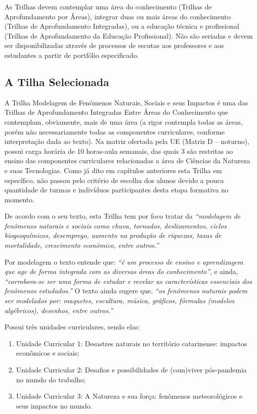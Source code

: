 As Trilhas devem contemplar uma área do conhecimento (Trilhas de Aprofundamento por Áreas), integrar duas ou mais áreas do conhecimento (Trilhas de Aprofundamento Integradas), ou a educação técnica e profissional (Trilhas de Aprofundamento da Educação Profissional). Não são seriadas e devem ser disponibilizadas através de processos de escutas aos professores e aos estudantes a partir de portfólio especificado.

\subsection{A Tilha Selecionada} %
\label{sub:A Tilha Selecionada}
A Trilha Modelagem de Fenômenos Naturais, Sociais e seus Impactos é uma das Trilhas de Aprofundamento Integradas Entre Áreas do Conhecimento que contemplam, obviamente, mais de uma área (a rigor contempla todas as áreas, porém não necessariamente todas as componentes curriculares, conforme interpretação dada ao texto). Na matriz ofertada pela \ac{UE} (Matriz D -- noturno), possui carga horária de 10 horas-aula semanais, das quais 3 são restritas ao ensino das componentes curriculares relacionadas a área de Ciências da Natureza e suas Tecnologias. Como já dito em capítulos anteriores esta Trilha em específico, não passou pelo critério de escolha dos alunos devido a pouca quantidade de turmas e indivíduos participantes desta etapa formativa no momento.

De acordo com o seu texto, esta Trilha tem por foco tratar da \textit{``modelagem de fenômenos naturais e sociais como chuva, tornados, deslizamentos, ciclos biogeoquímicos, desemprego, aumento na produção de riquezas, taxas de mortalidade, crescimento econômico, entre outros.''}

Por modelagem o texto entende que: \textit{``é um processo de ensino e aprendizagem que age de forma integrada com as diversas áreas do conhecimento''}, e ainda, \textit{``corrobora-se ser uma forma de estudar e revelar as características essenciais dos fenômenos estudados.''} O texto ainda sugere que, \textit{``os fenômenos naturais podem ser modelados por: maquetes, escultura, música, gráficos, fórmulas (modelos algébricos), desenhos, entre outros.''} 

Possui três unidades curriculares, sendo elas:
 \begin{enumerate}[label=\alph *)]
 		\item Unidade Curricular 1: Desastres  naturais no território catarinense: impactos econômicos e sociais;
		\item Unidade Curricular 2: Desafios e possibilidades de (com)viver pós-pandemia no mundo do trabalho;
		\item Unidade Curricular 3: A Natureza e sua força: fenômenos meteorológicos e seus impactos no mundo.
 \end{enumerate}

